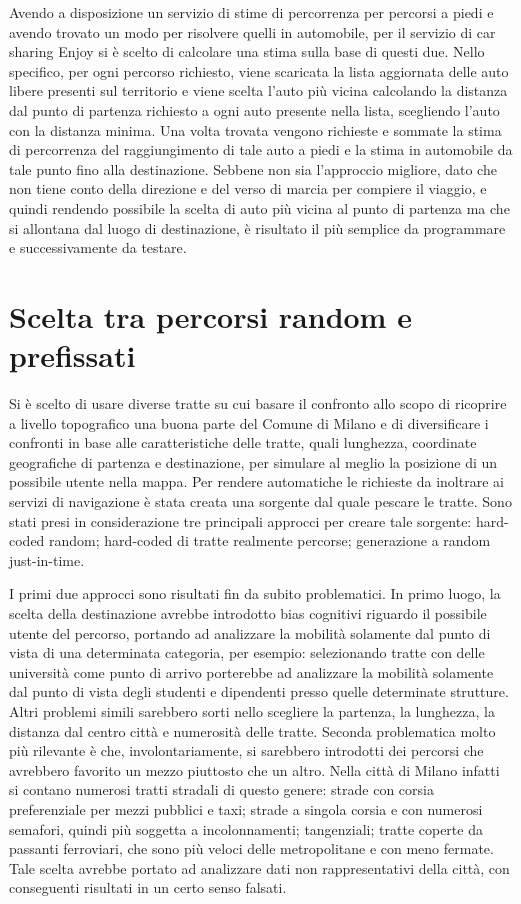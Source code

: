 Avendo a disposizione un servizio di stime di percorrenza per percorsi a piedi e avendo trovato un modo per risolvere quelli in automobile, per il servizio di car sharing Enjoy si è scelto di calcolare una stima sulla base di questi due. Nello specifico, per ogni percorso richiesto, viene scaricata la lista aggiornata delle auto libere presenti sul territorio e viene scelta l'auto più vicina calcolando la distanza dal punto di partenza richiesto a ogni auto presente nella lista, scegliendo l'auto con la distanza minima. Una volta trovata vengono richieste e sommate la stima di percorrenza del raggiungimento di tale auto a piedi e la stima in automobile da tale punto fino alla destinazione. Sebbene non sia l'approccio migliore, dato che non tiene conto della direzione e del verso di marcia per compiere il viaggio, e quindi rendendo possibile la scelta di auto più vicina al punto di partenza ma che si allontana dal luogo di destinazione, è risultato il più semplice da programmare e successivamente da testare.

\section{Scelta tra percorsi random e prefissati}

Si è scelto di usare diverse tratte su cui basare il confronto allo scopo di ricoprire a livello topografico una buona parte del Comune di Milano e di diversificare i confronti in base alle caratteristiche delle tratte, quali lunghezza, coordinate geografiche di partenza e destinazione, per simulare al meglio la posizione di un possibile utente nella mappa. Per rendere automatiche le richieste da inoltrare ai servizi di navigazione è stata creata una sorgente dal quale pescare le tratte. Sono stati presi in considerazione tre principali approcci per creare tale sorgente: hard-coded random; hard-coded di tratte realmente percorse; generazione a random just-in-time.

I primi due approcci sono risultati fin da subito problematici. In primo luogo, la scelta della destinazione avrebbe introdotto bias cognitivi riguardo il possibile utente del percorso, portando ad analizzare la mobilità solamente dal punto di vista di una determinata categoria, per esempio: selezionando tratte con delle università come punto di arrivo porterebbe ad analizzare la mobilità solamente dal punto di vista degli studenti e dipendenti presso quelle determinate strutture. Altri problemi simili sarebbero sorti nello scegliere la partenza, la lunghezza, la distanza dal centro città e numerosità delle tratte. Seconda problematica molto più rilevante è che, involontariamente, si sarebbero introdotti dei percorsi che avrebbero favorito un mezzo piuttosto che un altro. Nella città di Milano infatti si contano numerosi tratti stradali di questo genere: strade con corsia preferenziale per mezzi pubblici e taxi; strade a singola corsia e con numerosi semafori, quindi più soggetta a incolonnamenti; tangenziali; tratte coperte da passanti ferroviari, che sono più veloci delle metropolitane e con meno fermate. Tale scelta avrebbe portato ad analizzare dati non rappresentativi della città, con conseguenti risultati in un certo senso falsati.

